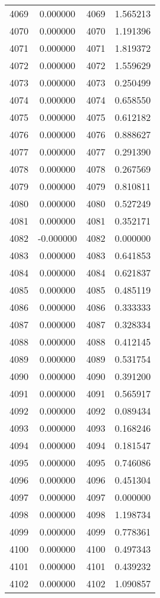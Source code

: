 \documentclass[12pt]{article}
\begin{document}
\begin{longtable}{@{}cccc@{}}
4069 & 0.000000 & 4069 & 1.565213 \\
4070 & 0.000000 & 4070 & 1.191396 \\
4071 & 0.000000 & 4071 & 1.819372 \\
4072 & 0.000000 & 4072 & 1.559629 \\
4073 & 0.000000 & 4073 & 0.250499 \\
4074 & 0.000000 & 4074 & 0.658550 \\
4075 & 0.000000 & 4075 & 0.612182 \\
4076 & 0.000000 & 4076 & 0.888627 \\
4077 & 0.000000 & 4077 & 0.291390 \\
4078 & 0.000000 & 4078 & 0.267569 \\
4079 & 0.000000 & 4079 & 0.810811 \\
4080 & 0.000000 & 4080 & 0.527249 \\
4081 & 0.000000 & 4081 & 0.352171 \\
4082 & -0.000000 & 4082 & 0.000000 \\
4083 & 0.000000 & 4083 & 0.641853 \\
4084 & 0.000000 & 4084 & 0.621837 \\
4085 & 0.000000 & 4085 & 0.485119 \\
4086 & 0.000000 & 4086 & 0.333333 \\
4087 & 0.000000 & 4087 & 0.328334 \\
4088 & 0.000000 & 4088 & 0.412145 \\
4089 & 0.000000 & 4089 & 0.531754 \\
4090 & 0.000000 & 4090 & 0.391200 \\
4091 & 0.000000 & 4091 & 0.565917 \\
4092 & 0.000000 & 4092 & 0.089434 \\
4093 & 0.000000 & 4093 & 0.168246 \\
4094 & 0.000000 & 4094 & 0.181547 \\
4095 & 0.000000 & 4095 & 0.746086 \\
4096 & 0.000000 & 4096 & 0.451304 \\
4097 & 0.000000 & 4097 & 0.000000 \\
4098 & 0.000000 & 4098 & 1.198734 \\
4099 & 0.000000 & 4099 & 0.778361 \\
4100 & 0.000000 & 4100 & 0.497343 \\
4101 & 0.000000 & 4101 & 0.439232 \\
4102 & 0.000000 & 4102 & 1.090857 \\

\end{longtable}
\end{document}

